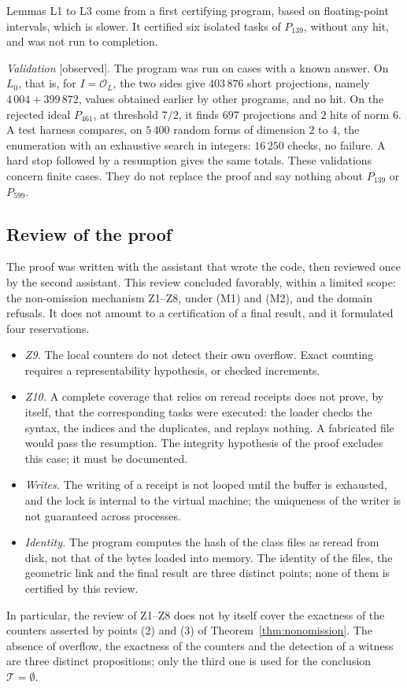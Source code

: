 \documentclass[11pt,a4paper]{amsart}
\theoremstyle{plain}
\theoremstyle{definition}
\numberwithin{equation}{section}
\newcommand{\OO}{\mathcal{O}}
\newcommand{\Tc}{\mathcal{T}}
\newcommand{\Lz}{L_{0}}
\newcommand{\st}[1]{\textup{\textsf{\small[#1]}}}
\newcommand{\CONS}{\st{observed}}
\begin{document}
Lemmas L1 to L3 come from a first certifying program, based on floating-point intervals, which is slower. It certified six isolated tasks of $P_{139}$, without any hit, and was not run to completion.

\emph{Validation} \CONS. The program was run on cases with a known answer. On $\Lz$, that is, for $I=\OO_L$, the two sides give $403\,876$ short projections, namely $4\,004+399\,872$, values obtained earlier by other programs, and no hit. On the rejected ideal $P_{461}$, at threshold $7/2$, it finds $697$ projections and $2$ hits of norm $6$. A test harness compares, on $5\,400$ random forms of dimension $2$ to $4$, the enumeration with an exhaustive search in integers: $16\,250$ checks, no failure. A hard stop followed by a resumption gives the same totals. These validations concern finite cases. They do not replace the proof and say nothing about $P_{139}$ or $P_{599}$.

\subsection{Review of the proof}
The proof was written with the assistant that wrote the code, then reviewed once by the second assistant. This review concluded favorably, within a limited scope: the non-omission mechanism Z1--Z8, under (M1) and (M2), and the domain refusals. It does not amount to a certification of a final result, and it formulated four reservations.
\begin{itemize}
\item \emph{Z9.} The local counters do not detect their own overflow. Exact counting requires a representability hypothesis, or checked increments.
\item \emph{Z10.} A complete coverage that relies on reread receipts does not prove, by itself, that the corresponding tasks were executed: the loader checks the syntax, the indices and the duplicates, and replays nothing. A fabricated file would pass the resumption. The integrity hypothesis of the proof excludes this case; it must be documented.
\item \emph{Writes.} The writing of a receipt is not looped until the buffer is exhausted, and the lock is internal to the virtual machine; the uniqueness of the writer is not guaranteed across processes.
\item \emph{Identity.} The program computes the hash of the class files as reread from disk, not that of the bytes loaded into memory. The identity of the files, the geometric link and the final result are three distinct points; none of them is certified by this review.
\end{itemize}
In particular, the review of Z1--Z8 does not by itself cover the exactness of the counters asserted by points (2) and (3) of Theorem~\ref{thm:nonomission}. The absence of overflow, the exactness of the counters and the detection of a witness are three distinct propositions; only the third one is used for the conclusion $\Tc=\emptyset$.
\end{document}
